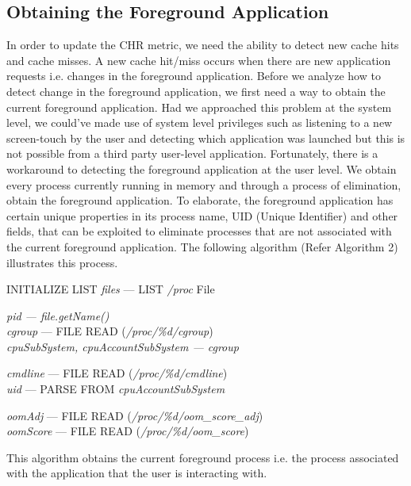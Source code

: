 \documentclass[12pt]{uthesis-v12}  %
\begin{document}
		\subsection{Obtaining the Foreground Application}
			In order to update the CHR metric, we need the ability to detect new cache hits and cache misses. A new cache hit/miss occurs when there are new application requests i.e. changes in the foreground application. Before we analyze how to detect change in the foreground application, we first need a way to obtain the current foreground application. Had we approached this problem at the system level, we could've made use of system level privileges such as listening to a new screen-touch by the user and detecting which application was  launched but this is not possible from a third party user-level application. Fortunately, there is a workaround to detecting the foreground application at the user level. We obtain every process currently running in memory and through a process of elimination, obtain the foreground application. To elaborate, the foreground application has certain unique properties in its process name, UID (Unique Identifier) and other fields, that can be exploited to eliminate processes that are not associated with the current foreground application. The following   algorithm (Refer Algorithm 2) illustrates this process.
			
			\begin{algorithm}[H]
				\SetAlgoLined
				
				INITIALIZE LIST {\em files} --- LIST {\em /proc} File\\
				{
					
					{\em pid --- file.getName()}\\
					{\em cgroup} --- FILE READ ({\em /proc/\%d/cgroup})\\
					{\em cpuSubSystem, cpuAccountSubSystem --- cgroup}\\
					
					
					{\em cmdline} --- FILE READ ({\em /proc/\%d/cmdline})\\
					{\em uid} --- PARSE FROM {\em cpuAccountSubSystem}\\
					
					
					{\em oomAdj} --- FILE READ ({\em /proc/\%d/oom\_score\_adj})\\
					{\em oomScore} --- FILE READ ({\em /proc/\%d/oom\_score})\\
					
				}
				
				\caption[Algorithm to get current foreground application]{This algorithm obtains the current foreground process i.e. the process associated with the application that the user is interacting with.}
			\end{algorithm}
			
\end{document}
